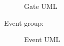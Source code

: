 \begin{figure}[h]
	\caption{\label{fig:subcaption_example}Gate UML}
\end{figure}

Event group:

\begin{figure}[h]
	\caption{\label{fig:subcaption_example}Event UML}
\end{figure}


